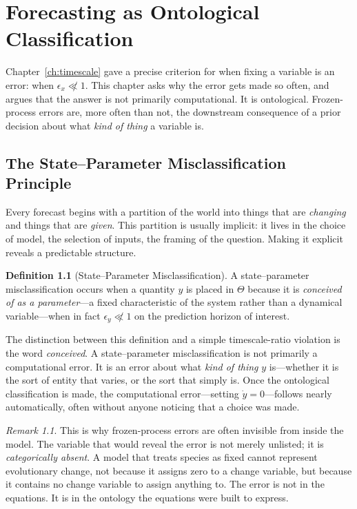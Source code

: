 \documentclass[11pt]{book}
\theoremstyle{plain}
\theoremstyle{definition}
\newtheorem{definition}[theorem]{Definition}
\theoremstyle{remark}
\newtheorem{remark}[theorem]{Remark}
\begin{document}
\chapter{Forecasting as Ontological Classification}
\label{ch:ontology}

Chapter~\ref{ch:timescale} gave a precise criterion for when fixing a variable is an error: when $\epsilon_x \not\ll 1$. This chapter asks why the error gets made so often, and argues that the answer is not primarily computational. It is ontological. Frozen-process errors are, more often than not, the downstream consequence of a prior decision about what \emph{kind of thing} a variable is.

\section{The State--Parameter Misclassification Principle}

Every forecast begins with a partition of the world into things that are \emph{changing} and things that are \emph{given}. This partition is usually implicit: it lives in the choice of model, the selection of inputs, the framing of the question. Making it explicit reveals a predictable structure.

\begin{definition}[State--Parameter Misclassification]
A state--parameter misclassification occurs when a quantity $y$ is placed in $\Theta$ because it is \emph{conceived of as a parameter}---a fixed characteristic of the system rather than a dynamical variable---when in fact $\epsilon_y \not\ll 1$ on the prediction horizon of interest.
\end{definition}

The distinction between this definition and a simple timescale-ratio violation is the word \emph{conceived}. A state--parameter misclassification is not primarily a computational error. It is an error about what \emph{kind of thing} $y$ is---whether it is the sort of entity that varies, or the sort that simply is. Once the ontological classification is made, the computational error---setting $\dot y = 0$---follows nearly automatically, often without anyone noticing that a choice was made.

\begin{remark}
This is why frozen-process errors are often invisible from inside the model. The variable that would reveal the error is not merely unlisted; it is \emph{categorically absent}. A model that treats species as fixed cannot represent evolutionary change, not because it assigns zero to a change variable, but because it contains no change variable to assign anything to. The error is not in the equations. It is in the ontology the equations were built to express.
\end{remark}
\end{document}
